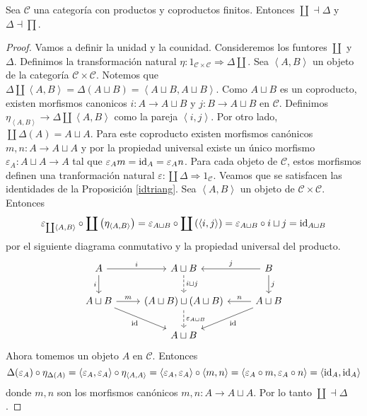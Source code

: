 \documentclass{comunicaciones}
\begin{document}
\begin{ej}
	\begin{prop}
		Sea $\mathcal{C}$ una categor\'ia con productos y coproductos finitos. Entonces $\coprod\dashv \Delta$ y $\Delta\dashv \prod$.
	\end{prop}
	
	\begin{proof}
		Vamos a definir la unidad y la counidad. Consideremos los funtores $\coprod$ y $\Delta$. Definimos la transformaci\'on natural $\eta:1_{\mathcal{C}\times\mathcal{C}}\Rightarrow \Delta\coprod$. Sea $\left\langle A, B\right\rangle$ un objeto de la categor\'ia $\mathcal{C}\times\mathcal{C}$. Notemos que $\Delta\coprod\left\langle A, B\right\rangle=\Delta(A\sqcup B)=\left\langle A\sqcup B, A\sqcup B\right\rangle $. Como $A\sqcup B$ es un coproducto, existen morfismos canonicos $i:A\to A\sqcup B$ y $j:B\to A\sqcup B$ en $\mathcal{C}$. Definimos $\eta_{\left\langle A,B\right\rangle}\to\Delta\coprod\left\langle A, B\right\rangle$ como la pareja $\left\langle i,j\right\rangle$. Por otro lado, $\coprod\Delta(A)=A\sqcup A$. Para este coproducto existen morfismos can\'onicos $m,n:A\to A\sqcup A$ y por la propiedad universal existe un \'unico morfismo $\varepsilon_{A}:A\sqcup A\to A$ tal que $\varepsilon_{A}m=\mathrm{id}_A=\varepsilon_{A}n$. Para cada objeto de $\mathcal{C}$, estos morfismos definen una tranformaci\'on natural $\varepsilon:\coprod\Delta\Rightarrow 1_\mathcal{C}$. Veamos que se satisfacen las identidades de la Proposici\'on \ref{idtriang}. Sea $\left\langle A,B\right\rangle$ un objeto de $\mathcal{C}\times\mathcal{C}$. Entonces
		\[\varepsilon_{\coprod\left\langle A,B\right\rangle}\circ \coprod\left( \eta_{\left\langle A,B\right\rangle}\right)=\varepsilon_{A\sqcup B}\circ \coprod\left(\left\langle i,j\right\rangle\right)=\varepsilon_{A\sqcup B}\circ i\sqcup j=\mathrm{id}_{A\sqcup B}\]
		por el siguiente diagrama conmutativo y la propiedad universal del producto.
		\[
		\begin{tikzcd}
			A \arrow[r,"i"] \arrow[d,"i"'] & A\sqcup B \arrow[d, dashed, "i\sqcup j"] & B \arrow[l, "j"'] \arrow[d, "j"] \\
			A\sqcup B \arrow[r, "m"] \arrow[dr, "\id"'] & (A\sqcup B)\sqcup(A\sqcup B) \arrow[d, dashed, "\varepsilon_{A\sqcup B}"] & A\sqcup B \arrow[l, "n"'] \arrow[dl, "\id"] \\
			& A\sqcup B & 
		\end{tikzcd}
		\]
		Ahora tomemos un objeto $A$ en $\mathcal{C}$. Entonces 
		\[\Delta(\varepsilon_{A})\circ\eta_{\Delta(A)}=\left\langle \varepsilon_{A},\varepsilon_{A}\right\rangle\circ\eta_{\left\langle A,A\right\rangle}=\left\langle \varepsilon_{A},\varepsilon_{A}\right\rangle\circ\left\langle m,n\right\rangle=\left\langle \varepsilon_{A}\circ m,\varepsilon_{A}\circ n\right\rangle=\left\langle \mathrm{id}_{A},\mathrm{id}_{A}\right\rangle\]
		donde $m,n$ son los morfismos can\'onicos $m,n:A\to A\sqcup A$. Por lo tanto $\coprod\dashv \Delta$.
		

\end{proof}
\end{ej}
\end{document}
